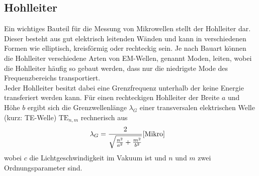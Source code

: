         \subsection{Hohlleiter}
            Ein wichtiges Bauteil für die Messung von Mikrowellen stellt der Hohlleiter dar.
            Dieser besteht aus gut elektrisch leitenden Wänden und kann in verschiedenen Formen wie elliptisch, kreisförmig oder rechteckig sein. 
            Je nach Bauart können die Hohlleiter verschiedene Arten von EM-Wellen, genannt Moden, leiten, wobei die Hohlleiter häufig so gebaut werden,
            dass nur die niedrigste Mode des Frequenzbereichs transportiert.\\
            Jeder Hohlleiter besitzt dabei eine Grenzfrequenz unterhalb der keine Energie transferiert werden kann.
            Für einen rechteckigen Hohlleiter der Breite $a$ und Höhe $b$ ergibt sich die Grenzwellenlänge $\lambda_G$ einer transversalen elektrischen Welle (kurz: TE-Welle) $\text{TE}_{n,m}$ rechnerisch aus
            \begin{align}
                \lambda _G &=  \frac{2}{\sqrt{\frac{n^2}{a^2}+\frac{m^2}{b^2}}} \text{\cite{Mikro}} \label{eq:G}
            \end{align}
            wobei $c$ die Lichtgeschwindigkeit im Vakuum ist und $n$ und $m$ zwei Ordnungsparameter sind.


